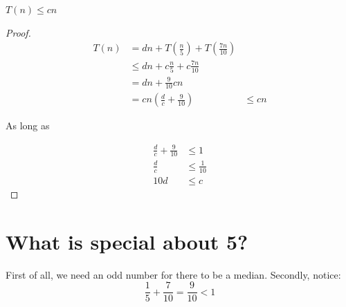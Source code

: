 \begin{claim}
$ T(n) \leq cn $
\end{claim}

\begin{proof}
\begin{align*}
T(n)
&= dn + T \left( \frac{n}{5} \right) +T \left( \frac{7n}{10} \right) \\
&\leq dn + c \frac{n}{5} + c \frac{7n}{10} \\
&= dn + \frac{9}{10}cn \\
&= cn \left( \frac{d}{c} + \frac{9}{10} \right)
&\leq cn
\end{align*}

As long as

\begin{align*}
\frac{d}{c} + \frac{9}{10} &\leq 1 \\
\frac{d}{c} &\leq \frac{1}{10} \\
10 d &\leq c
\end{align*}
\end{proof}

\section{What is special about 5?}

First of all, we need an odd number for there to be a median.
Secondly, notice:
%
\begin{displaymath}
\frac{1}{5} + \frac{7}{10} = \frac{9}{10} < 1
\end{displaymath}
